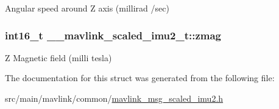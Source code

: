 Angular speed around Z axis (millirad /sec) 

\hypertarget{struct____mavlink__scaled__imu2__t_ae9a37d697427541d41a0cc7dd8b2a42f}{
\subsubsection[{zmag}]{\setlength{\rightskip}{0pt plus 5cm}int16\+\_\+t \+\_\+\+\_\+mavlink\+\_\+scaled\+\_\+imu2\+\_\+t\+::zmag}}\label{struct____mavlink__scaled__imu2__t_ae9a37d697427541d41a0cc7dd8b2a42f}


Z Magnetic field (milli tesla) 



The documentation for this struct was generated from the following file\+:\begin{DoxyCompactItemize}
\item 
src/main/mavlink/common/\hyperlink{mavlink__msg__scaled__imu2_8h}{mavlink\+\_\+msg\+\_\+scaled\+\_\+imu2.\+h}\end{DoxyCompactItemize}
